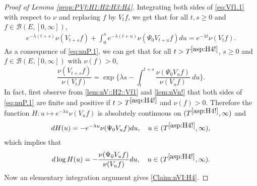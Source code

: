 \documentclass[12pt,a4paper]{amsart}
\numberwithin{equation}{section}
\theoremstyle{plain}
\theoremstyle{definition}
\theoremstyle{remark}
\begin{document}
\begin{proof}[Proof of Lemma \ref{prop:PVf:H1:H2:H3:H4}]
	
	Integrating  both sides of \eqref{eq:Vf1.1} with respect to $\nu$ and replacing $f$ by $V_t f$, we get that for all $t, s\geq 0$ and $f\in \mathcal B(E,[0,\infty])$,
\begin{align}\label{eq:nuP.1}
	e^{- \lambda (t+s)} \nu(V_{t+s}f) + \int_0^s e^{- \lambda (t+u)} \nu(\Psi_0 V_{t+u}f) du
	= e^{- \lambda t} \nu(V_t f).
\end{align}
	As a consequence of \eqref{eq:nuP.1}, we can get that for all $t>T^{\eqref{asp:H4!}}$, $s\geq 0$ and $f \in \mathcal B(E,[0,\infty])$ with $\nu(f)>0$,
\begin{equation}\label{Claim:nVI:H4}
	\frac{\nu(V_{t+s} f)} {\nu(V_t f)}
	= \exp\Big\{ \lambda s - \int_t^{t+s} \frac{\nu(\Psi_0 V_u f) }{\nu(V_u f)} ~du\Big\}.
\end{equation}
	In fact, first observe from \eqref{lem:nV::H2::Vf1} and \eqref{lem:nVn!} that both sides of \eqref{eq:nuP.1} are finite and positive if $t> T^{\eqref{asp:H4!}}$ and $\nu(f)>0$.
	Therefore the function $H: u\mapsto e^{-\lambda u}\nu(V_u f)$ is absolutely continuous on $(T^{\eqref{asp:H4!}},\infty)$ and
\begin{align}
	d H(u)
	= - e^{- \lambda u} \nu(\Psi_0 V_u f) du,
	\quad u\in (T^{\eqref{asp:H4!}},\infty),
\end{align}
	which implies that
\begin{align}
	d \log H(u)
	= - \frac{\nu(\Psi_0 V_u f )}{ \nu(V_u f)} du,
	\quad u \in (T^{\eqref{asp:H4!}},\infty).
\end{align}
	Now an elementary integration argument gives \eqref{Claim:nVI:H4}.
	

\end{proof}
\end{document}
